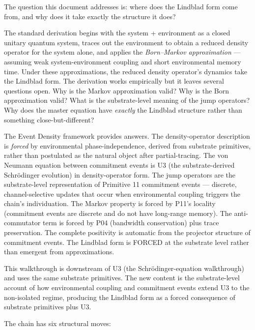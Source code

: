 \documentclass[11pt,a4paper]{article}
\begin{document}
The question this document addresses is: where does the Lindblad form come from, and why does it take exactly the structure it does?

The standard derivation begins with the system + environment as a closed unitary quantum system, traces out the environment to obtain a reduced density operator for the system alone, and applies the \emph{Born--Markov approximation} --- assuming weak system-environment coupling and short environmental memory time. Under these approximations, the reduced density operator's dynamics take the Lindblad form. The derivation works empirically but it leaves several questions open. Why is the Markov approximation valid? Why is the Born approximation valid? What is the substrate-level meaning of the jump operators? Why does the master equation have \emph{exactly} the Lindblad structure rather than something close-but-different?

The Event Density framework provides answers. The density-operator description is \emph{forced} by environmental phase-independence, derived from substrate primitives, rather than postulated as the natural object after partial-tracing. The von Neumann equation between commitment events is U3 (the substrate-derived Schr\"odinger evolution) in density-operator form. The jump operators are the substrate-level representation of Primitive 11 commitment events --- discrete, channel-selective updates that occur when environmental coupling triggers the chain's individuation. The Markov property is forced by P11's locality (commitment events are discrete and do not have long-range memory). The anti-commutator term is forced by P04 (bandwidth conservation) plus trace preservation. The complete positivity is automatic from the projector structure of commitment events. The Lindblad form is FORCED at the substrate level rather than emergent from approximations.

This walkthrough is downstream of U3 (the Schr\"odinger-equation walkthrough) and uses the same substrate primitives. The new content is the substrate-level account of how environmental coupling and commitment events extend U3 to the non-isolated regime, producing the Lindblad form as a forced consequence of substrate primitives plus U3.

The chain has six structural moves:
\end{document}
